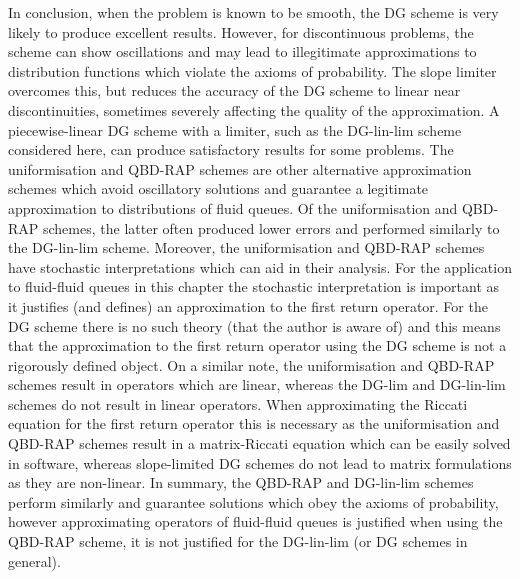 In conclusion, when the problem is known to be smooth, the DG scheme is very likely to produce excellent results. However, for discontinuous problems, the scheme can show oscillations and may lead to illegitimate approximations to distribution functions which violate the axioms of probability. The slope limiter overcomes this, but reduces the accuracy of the DG scheme to linear near discontinuities, sometimes severely affecting the quality of the approximation. A piecewise-linear DG scheme with a limiter, such as the DG-lin-lim scheme considered here, can produce satisfactory results for some problems. The uniformisation and QBD-RAP schemes are other alternative approximation schemes which avoid oscillatory solutions and guarantee a legitimate approximation to distributions of fluid queues. Of the uniformisation and QBD-RAP schemes, the latter often produced lower errors and performed similarly to the DG-lin-lim scheme. Moreover, the uniformisation and QBD-RAP schemes have stochastic interpretations which can aid in their analysis. For the application to fluid-fluid queues in this chapter the stochastic interpretation is important as it justifies (and defines) an approximation to the first return operator. For the DG scheme there is no such theory (that the author is aware of) and this means that the approximation to the first return operator using the DG scheme is not a rigorously defined object. On a similar note, the uniformisation and QBD-RAP schemes result in operators which are linear, whereas the DG-lim and DG-lin-lim schemes do not result in linear operators. When approximating the Riccati equation for the first return operator this is necessary as the uniformisation and QBD-RAP schemes result in a matrix-Riccati equation which can be easily solved in software, whereas slope-limited DG schemes do not lead to matrix formulations as they are non-linear. In summary, the QBD-RAP and DG-lin-lim schemes perform similarly and guarantee solutions which obey the axioms of probability, however approximating operators of fluid-fluid queues is justified when using the QBD-RAP scheme, it is not justified for the DG-lin-lim (or DG schemes in general). 
